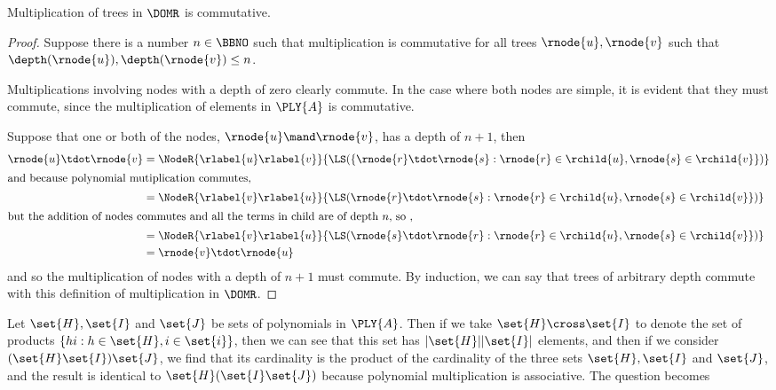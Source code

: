 \begin{proposition}\label{TMcommutativity}
  Multiplication of trees in $\DOMR$ is commutative.
  \begin{proof}
    Suppose there is a number $n\in\BBNO$ such that multiplication is
    commutative for all trees $\rnode{u}, \rnode{v}$ such that
    $\depth(\rnode{u}), \depth(\rnode{v}) \le n$.

    Multiplications involving nodes with a depth of zero clearly
    commute.  In the case where both nodes are simple, it is evident
    that they must commute, since the multiplication of elements in
    $\PLY{A}$ is commutative.

    Suppose that one or both of the nodes, $\rnode{u} \mand \rnode{v}$,
    has a depth of $n+1$, then
    \begin{align*}
      \rnode{u}\tdot\rnode{v} &= \NodeR{\rlabel{u}\rlabel{v}}{\LS(\{\rnode{r} \tdot \rnode{s}: \rnode{r}\in\rchild{u},\rnode{s}\in\rchild{v}\})}\\
      \intertext{and because polynomial mutiplication commutes,}
      &= \NodeR{\rlabel{v}\rlabel{u}}{\LS({\rnode{r} \tdot\rnode{s}: \rnode{r}\in\rchild{u},\rnode{s}\in\rchild{v}\}})}\\
        \intertext{but the addition of nodes commutes and all the terms in child are of depth $n$, so ,}
      &= \NodeR{\rlabel{v}\rlabel{u}}{\LS({\rnode{s} \tdot\rnode{r}: \rnode{r}\in\rchild{u},\rnode{s}\in\rchild{v}\}})}\\
      &=\rnode{v}\tdot\rnode{u}\,
    \end{align*}  
    and so the multiplication of nodes with a depth of $n+1$ must commute.  By
    induction, we can say that trees of arbitrary depth commute with
    this definition of multiplication in $\DOMR$.
  \end{proof}
\end{proposition}

\begin{lemma}
  Let $\set{H}, \set{I}$ and $\set{J}$ be sets of polynomials in $\PLY{A}$.  Then if we
  take $\set{H} \cross \set{I}$ to denote the set of products $\{h i: h \in \set{H}, i
  \in \set{i}\}$, then we can see that this set has $\vert\set{H}\vert
  \vert\set{I}\vert$ elements, and then if we consider $(\set{H} \set{I}) \set{J}$, we
  find that its cardinality is the product of the cardinality of the three sets
  $\set{H}, \set{I}$ and $\set{J}$, and the result is identical to $\set{H} (\set{I}
  \set{J})$ because polynomial multiplication is associative.  The question becomes
\end{lemma}  

